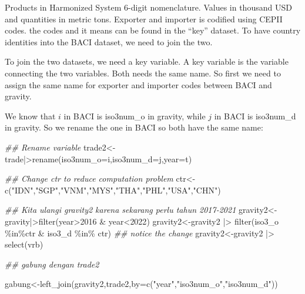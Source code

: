 \documentclass[
  a4paper,
  DIV=11,
  numbers=noendperiod]{scrreprt}
\newenvironment{Shaded}{\begin{snugshade}}{\end{snugshade}}
\newcommand{\AttributeTok}[1]{\textcolor[rgb]{0.40,0.45,0.13}{#1}}
\newcommand{\DecValTok}[1]{\textcolor[rgb]{0.68,0.00,0.00}{#1}}
\newcommand{\DocumentationTok}[1]{\textcolor[rgb]{0.37,0.37,0.37}{\textit{#1}}}
\newcommand{\FunctionTok}[1]{\textcolor[rgb]{0.28,0.35,0.67}{#1}}
\newcommand{\NormalTok}[1]{\textcolor[rgb]{0.00,0.23,0.31}{#1}}
\newcommand{\OtherTok}[1]{\textcolor[rgb]{0.00,0.23,0.31}{#1}}
\newcommand{\SpecialCharTok}[1]{\textcolor[rgb]{0.37,0.37,0.37}{#1}}
\newcommand{\StringTok}[1]{\textcolor[rgb]{0.13,0.47,0.30}{#1}}
\begin{document}
Products in Harmonized System 6-digit nomenclature. Values in thousand
USD and quantities in metric tons. Exporter and importer is codified
using CEPII codes. the codes and it means can be found in the ``key''
dataset. To have country identities into the BACI dataset, we need to
join the two.

To join the two datasets, we need a key variable. A key variable is the
variable connecting the two variables. Both needs the same name. So
first we need to assign the same name for exporter and importer codes
between BACI and gravity.

We know that \(i\) in BACI is iso3num\_o in gravity, while \(j\) in BACI
is iso3num\_d in gravity. So we rename the one in BACI so both have the
same name:

\begin{Shaded}
\begin{Highlighting}[numbers=left,,]
\DocumentationTok{\#\# Rename variable}
\NormalTok{trade2}\OtherTok{\textless{}{-}}\NormalTok{trade}\SpecialCharTok{|\textgreater{}}\FunctionTok{rename}\NormalTok{(}\AttributeTok{iso3num\_o=}\NormalTok{i,}\AttributeTok{iso3num\_d=}\NormalTok{j,}\AttributeTok{year=}\NormalTok{t)}

\DocumentationTok{\#\# Change ctr to reduce computation problem}
\NormalTok{ctr}\OtherTok{\textless{}{-}}\FunctionTok{c}\NormalTok{(}\StringTok{"IDN"}\NormalTok{,}\StringTok{"SGP"}\NormalTok{,}\StringTok{"VNM"}\NormalTok{,}\StringTok{"MYS"}\NormalTok{,}\StringTok{"THA"}\NormalTok{,}\StringTok{"PHL"}\NormalTok{,}\StringTok{"USA"}\NormalTok{,}\StringTok{"CHN"}\NormalTok{)}

\DocumentationTok{\#\# Kita ulangi gravity2 karena sekarang perlu tahun 2017{-}2021}
\NormalTok{gravity2}\OtherTok{\textless{}{-}}\NormalTok{gravity}\SpecialCharTok{|\textgreater{}}\FunctionTok{filter}\NormalTok{(year}\SpecialCharTok{\textgreater{}}\DecValTok{2016} \SpecialCharTok{\&}\NormalTok{ year}\SpecialCharTok{\textless{}}\DecValTok{2022}\NormalTok{)}
\NormalTok{gravity2}\OtherTok{\textless{}{-}}\NormalTok{gravity2 }\SpecialCharTok{|\textgreater{}} \FunctionTok{filter}\NormalTok{(iso3\_o }\SpecialCharTok{\%in\%}\NormalTok{ctr }\SpecialCharTok{\&}\NormalTok{ iso3\_d }\SpecialCharTok{\%in\%}\NormalTok{ ctr) }\DocumentationTok{\#\# notice the change}
\NormalTok{gravity2}\OtherTok{\textless{}{-}}\NormalTok{gravity2 }\SpecialCharTok{|\textgreater{}} \FunctionTok{select}\NormalTok{(vrb)}

\DocumentationTok{\#\# gabung dengan trade2}

\NormalTok{gabung}\OtherTok{\textless{}{-}}\FunctionTok{left\_join}\NormalTok{(gravity2,trade2,}\AttributeTok{by=}\FunctionTok{c}\NormalTok{(}\StringTok{"year"}\NormalTok{,}\StringTok{"iso3num\_o"}\NormalTok{,}\StringTok{"iso3num\_d"}\NormalTok{))}
\end{Highlighting}
\end{Shaded}
\end{document}
